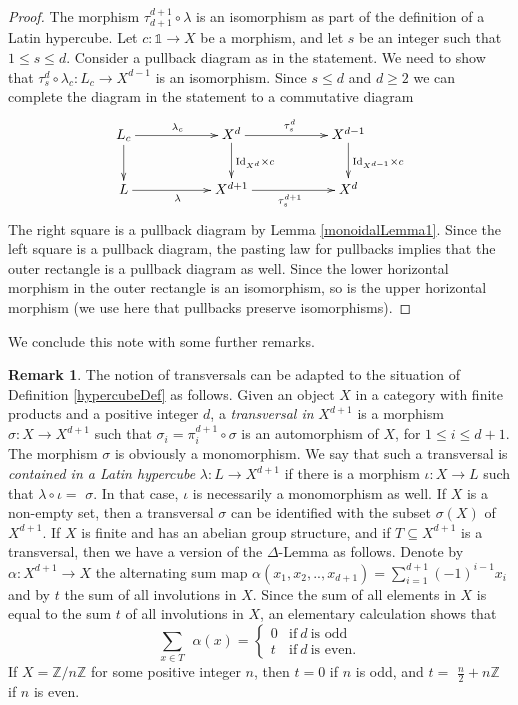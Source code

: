 \documentclass{amsart} %
\theoremstyle{plain}\newtheorem{Theorem}{Theorem}[section]
\theoremstyle{plain}\newtheorem{Conjecture}[Theorem]{Conjecture}
\theoremstyle{plain}\newtheorem{Corollary}[Theorem]{Corollary}
\theoremstyle{plain}\newtheorem{Lemma}[Theorem]{Lemma}
\theoremstyle{plain}\newtheorem{Proposition}[Theorem]{Proposition}
\theoremstyle{definition}\newtheorem{Definition}[Theorem]{Definition}
\theoremstyle{definition}\newtheorem{Example}[Theorem]{Example}
\theoremstyle{definition}\newtheorem{Examples}[Theorem]{Examples}
\theoremstyle{definition}\newtheorem{Remark}[Theorem]{Remark}
\theoremstyle{definition}\newtheorem{Remarks}[Theorem]{Remarks}
\theoremstyle{plain}\newtheorem{Statement}[Theorem]{}
\def\Z{{\mathbb Z}}
\def\One{{\mathds{1}}}
\def\Id{\mathrm{Id}}             \def\tenA{\otimes_A}
\begin{document}
\begin{proof} 
The morphism $\tau^{d+1}_{d+1}\circ\lambda$ is an isomorphism as part of the
definition of a Latin hypercube.
Let $c : \One \to X$ be a morphism, and let 
 $s$ be an integer such that $1\leq s\leq d$. Consider a pullback diagram as in the statement.
 We need to show that $\tau^d_s\circ\lambda_c : L_c \to X^{d-1}$ is an isomorphism. 
Since $s\leq d$ and $d\geq 2$ we can
complete the diagram in the statement to a commutative diagram
$$\xymatrix{L_c \ar[rr]^{\lambda_c} \ar[d] & & 
X^d \ar[rr]^{\tau^d_s} \ar[d]^{\Id_{X^d}\times c} & & X^{d-1} \ar[d]^{\Id_{X^{d-1}}\times c}\\
L \ar[rr]_\lambda & & X^{d+1} \ar[rr]_{\tau^{d+1}_s} & & X^d}$$
The right square is a pullback diagram by Lemma \ref{monoidalLemma1}. Since the left square
is a pullback diagram, the pasting law for pullbacks implies that the outer rectangle
is a pullback diagram as well. Since the lower horizontal morphism in the outer
rectangle is an isomorphism, so is the upper horizontal morphism (we use here that
pullbacks preserve isomorphisms). 
\end{proof}

We conclude this note with some further remarks.




\begin{Remark}
The notion of transversals can be adapted to the situation of Definition 
\ref{hypercubeDef} as follows.
Given an object $X$ in a category with finite products and a positive integer $d$, 
a {\em transversal in} $X^{d+1}$ is a morphism $\sigma : X\to X^{d+1}$ such that
$\sigma_i=\pi^{d+1}_i\circ\sigma$ is an automorphism of $X$, for $1\leq i\leq d+1$.
The morphism $\sigma$ is obviously a monomorphism. 
We say that such a transversal is {\em contained in a Latin hypercube} 
$\lambda : L\to X^{d+1}$ if there is a morphism $\iota : X\to L$ such that
$\lambda\circ\iota=$ $\sigma$. In that case, $\iota$ is necessarily a monomorphism
as well.  If $X$ is a non-empty set, then a transversal $\sigma$
can be identified with the subset $\sigma(X)$ of $X^{d+1}$. If $X$ is finite and has
an abelian group structure, and if $T\subseteq X^{d+1}$ is a transversal, then
we have a version of the $\Delta$-Lemma \cite[Lemma 2.1]{Wan} as follows.
Denote by $\alpha : X^{d+1}\to X$ the alternating sum map
$\alpha(x_1,x_2,..,x_{d+1})=\sum_{i=1}^{d+1} (-1)^{i-1}x_i$ and by $t$ the
sum of all involutions in $X$. Since the sum of all elements in $X$ is equal
to the sum $t$ of all involutions in $X$, an elementary calculation shows that
$$\sum_{x \in T} \ \ \alpha(x) = 
\begin{cases}
0 &  \text{if}\ d \ \text{is odd} \\[3pt]  %
t &  \text{if}\ d\ \text{is even.}
\end{cases} $$
If $X=\Z/n\Z$ for some positive integer $n$, then $t=0$ if $n$ is odd, and $t=$ $\frac{n}{2} + n\Z$
if $n$ is even. 
\end{Remark}
\end{document}
